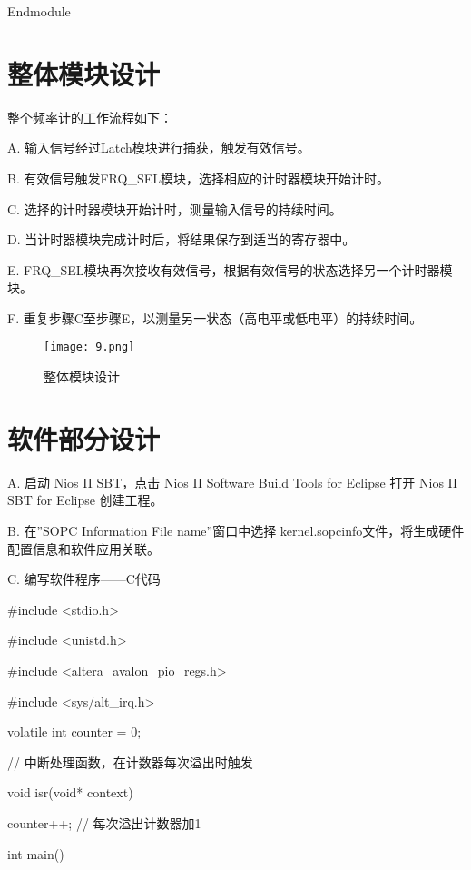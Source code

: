 \documentclass[AutoFakeBold]{LZUThesis}
\begin{document}
Endmodule

\section{整体模块设计}
整个频率计的工作流程如下：

A. 输入信号经过Latch模块进行捕获，触发有效信号。

B. 有效信号触发FRQ\_SEL模块，选择相应的计时器模块开始计时。

C. 选择的计时器模块开始计时，测量输入信号的持续时间。

D. 当计时器模块完成计时后，将结果保存到适当的寄存器中。

E. FRQ\_SEL模块再次接收有效信号，根据有效信号的状态选择另一个计时器模块。

F. 重复步骤C至步骤E，以测量另一状态（高电平或低电平）的持续时间。
\begin{figure}[htbp]
    \centering
    \texttt{[image: 9.png]}
    \caption{整体模块设计}
\end{figure}

\section{软件部分设计}
A. 启动 Nios II SBT，点击 Nios II Software Build Tools for Eclipse 打开 Nios II SBT for Eclipse
创建工程。

B. 在”SOPC Information File name”窗口中选择 kernel.sopcinfo文件，将生成硬件配置信息和软件应用关联。

C. 编写软件程序——C代码

\#include <stdio.h>

\#include <unistd.h>

\#include <altera\_avalon\_pio\_regs.h>

\#include <sys/alt\_irq.h>

volatile int counter = 0;

// 中断处理函数，在计数器每次溢出时触发

void isr(void* context)

{

    counter++;  // 每次溢出计数器加1

}

int main()
\end{document}
